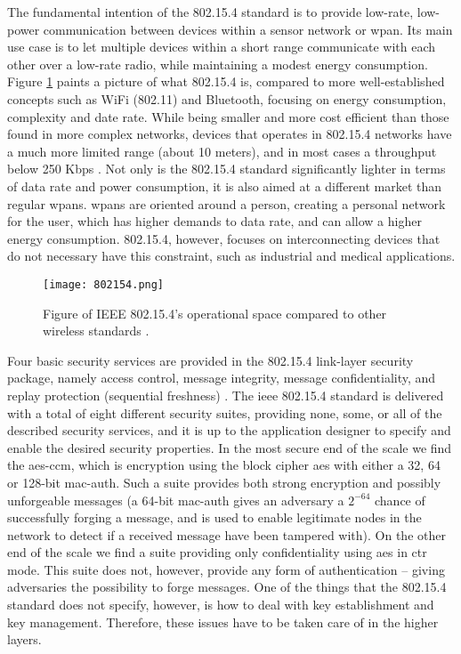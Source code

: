 The fundamental intention of the 802.15.4 standard is to provide low-rate, low-power communication between devices within a sensor network or \gls{wpan}. Its main use case is to let multiple devices within a short range communicate with each other over a low-rate radio, while maintaining a modest energy consumption. Figure \ref{fig:802154-figure} paints a picture of what 802.15.4 is, compared to more well-established concepts such as WiFi (802.11) and Bluetooth, focusing on energy consumption, complexity and date rate. While being smaller and more cost efficient than those found in more complex networks, devices that operates in 802.15.4 networks have a much more limited range (about 10 meters), and in most cases a throughput below 250 Kbps \cite{gutierrez2001ieee}. Not only is the 802.15.4 standard significantly lighter in terms of data rate and power consumption, it is also aimed at a different market than regular \gls{wpan}s. \gls{wpan}s are oriented around a person, creating a personal network for the user, which has higher demands to data rate, and can allow a higher energy consumption. 802.15.4, however, focuses on interconnecting devices that do not necessary have this constraint, such as industrial and medical applications. 


\begin{figure}[h]
	\centering
	\texttt{[image: 802154.png]}
	\caption{Figure of IEEE 802.15.4's operational space compared to other wireless standards \cite{gutierrez2001ieee}.}
	\label{fig:802154-figure}
\end{figure}

Four basic security services are provided in the 802.15.4 link-layer security package, namely access control, message integrity, message confidentiality, and replay protection (sequential freshness) \cite{sastry2004security}. The \gls{ieee} 802.15.4 standard is delivered with a total of eight different security suites, providing none, some, or all of the described security services, and it is up to the application designer to specify and enable the desired security properties. In the most secure end of the scale we find the \gls{aes}-\gls{ccm}, which is encryption using the block cipher \gls{aes} with either a 32, 64 or 128-bit \gls{mac-auth}. Such a suite provides both strong encryption and possibly unforgeable messages (a 64-bit \gls{mac-auth} gives an adversary a $2^{-64}$ chance of successfully forging a message, and is used to enable legitimate nodes in the network to detect if a received message have been tampered with). On the other end of the scale we find a suite providing only confidentiality using \gls{aes} in \gls{ctr} mode. This suite does not, however, provide any form of authentication -- giving adversaries the possibility to forge messages. One of the things that the 802.15.4 standard does not specify, however, is how to deal with key establishment and key management. Therefore, these issues have to be taken care of in the higher layers.


